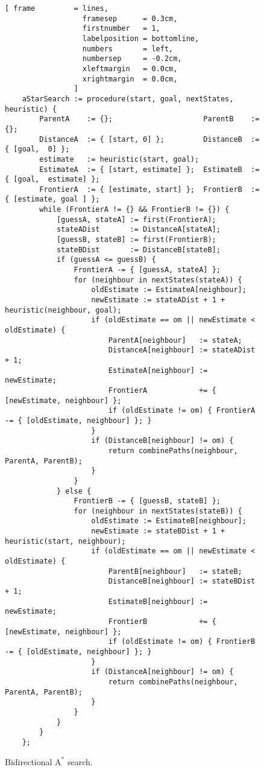\begin{figure}[!ht]
\centering
\begin{Verbatim}[ frame         = lines, 
                  framesep      = 0.3cm, 
                  firstnumber   = 1,
                  labelposition = bottomline,
                  numbers       = left,
                  numbersep     = -0.2cm,
                  xleftmargin   = 0.0cm,
                  xrightmargin  = 0.0cm,
                ]
    aStarSearch := procedure(start, goal, nextStates, heuristic) {
        ParentA    := {};                     ParentB    := {};                    
        DistanceA  := { [start, 0] };         DistanceB  := { [goal,  0] };
        estimate   := heuristic(start, goal);
        EstimateA  := { [start, estimate] };  EstimateB  := { [goal,  estimate] };  
        FrontierA  := { [estimate, start] };  FrontierB  := { [estimate, goal ] };  
        while (FrontierA != {} && FrontierB != {}) {
            [guessA, stateA] := first(FrontierA);
            stateADist       := DistanceA[stateA];
            [guessB, stateB] := first(FrontierB);
            stateBDist       := DistanceB[stateB];
            if (guessA <= guessB) {
                FrontierA -= { [guessA, stateA] };
                for (neighbour in nextStates(stateA)) {
                    oldEstimate := EstimateA[neighbour];
                    newEstimate := stateADist + 1 + heuristic(neighbour, goal);
                    if (oldEstimate == om || newEstimate < oldEstimate) {
                        ParentA[neighbour]   := stateA;
                        DistanceA[neighbour] := stateADist + 1;
                        EstimateA[neighbour] := newEstimate;
                        FrontierA            += { [newEstimate, neighbour] };
                        if (oldEstimate != om) { FrontierA -= { [oldEstimate, neighbour] }; }
                    }
                    if (DistanceB[neighbour] != om) {
                        return combinePaths(neighbour, ParentA, ParentB);
                    }
                }
            } else {
                FrontierB -= { [guessB, stateB] };
                for (neighbour in nextStates(stateB)) {
                    oldEstimate := EstimateB[neighbour];
                    newEstimate := stateBDist + 1 + heuristic(start, neighbour);
                    if (oldEstimate == om || newEstimate < oldEstimate) {
                        ParentB[neighbour]   := stateB;
                        DistanceB[neighbour] := stateBDist + 1;
                        EstimateB[neighbour] := newEstimate;
                        FrontierB            += { [newEstimate, neighbour] };
                        if (oldEstimate != om) { FrontierB -= { [oldEstimate, neighbour] }; }
                    }
                    if (DistanceA[neighbour] != om) {
                        return combinePaths(neighbour, ParentA, ParentB);
                    }
                }        
            }
        }
    };
\end{Verbatim}
\vspace*{-0.3cm}
\caption{Bidirectional $\mathrm{A}^*$ search.}
\label{fig:a-star-bidirectional.stlx}
\end{figure}
